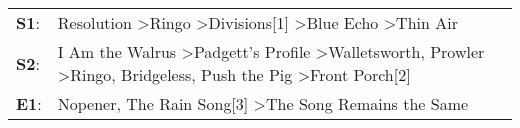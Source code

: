 \begin{supertabular}{p{0.03\textwidth}p{0.92\textwidth}}
 \textbf{S1}:  &                                                                                                                                         Resolution\textsuperscript{} \textgreater \enspace Ringo\textsuperscript{} \textgreater \enspace Divisions[1]\textsuperscript{} \textgreater \enspace Blue Echo\textsuperscript{} \textgreater \enspace Thin Air\textsuperscript{}  \enspace  \\
 \textbf{S2}:  &  I Am the Walrus\textsuperscript{} \textgreater \enspace Padgett's Profile\textsuperscript{} \textgreater \enspace Walletsworth\textsuperscript{}, \enspace Prowler\textsuperscript{} \textgreater \enspace Ringo\textsuperscript{}, \enspace Bridgeless\textsuperscript{}, \enspace Push the Pig\textsuperscript{} \textgreater \enspace Front Porch[2]\textsuperscript{}  \enspace  \\
 \textbf{E1}:  &                                                                                                                                                                                                                                   Nopener\textsuperscript{}, \enspace The Rain Song[3]\textsuperscript{} \textgreater \enspace The Song Remains the Same\textsuperscript{}  \enspace  \\
\end{supertabular}
